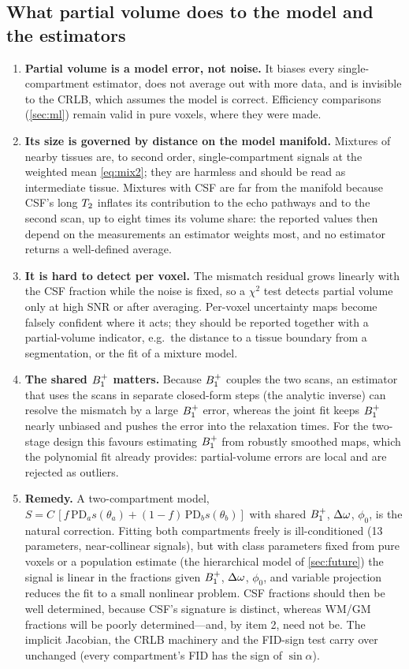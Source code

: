 \subsection{What partial volume does to the model and the estimators}

\begin{enumerate}
\item \textbf{Partial volume is a model error, not noise.} It biases every single-compartment
  estimator, does not average out with more data, and is invisible to the CRLB, which assumes
  the model is correct. Efficiency comparisons (\cref{sec:ml}) remain valid in pure voxels,
  where they were made.
\item \textbf{Its size is governed by distance on the model manifold.} Mixtures of nearby
  tissues are, to second order, single-compartment signals at the weighted mean \eqref{eq:mix2};
  they are harmless and should be read as intermediate tissue. Mixtures with CSF are far from the
  manifold because CSF's long $T_2$ inflates its contribution to the echo pathways and to the
  second scan, up to eight times its volume share: the reported values then depend on the
  measurements an estimator weights most, and no estimator returns a well-defined average.
\item \textbf{It is hard to detect per voxel.} The mismatch residual grows linearly with the
  CSF fraction while the noise is fixed, so a $\chi^2$ test detects partial volume only at high SNR
  or after averaging. Per-voxel uncertainty maps become falsely confident where it acts; they
  should be reported together with a partial-volume indicator, e.g.\ the distance to a tissue
  boundary from a segmentation, or the fit of a mixture model.
\item \textbf{The shared $B_1^{+}$ matters.} Because $B_1^{+}$ couples the two scans, an estimator that uses the
  scans in separate closed-form steps (the analytic inverse) can resolve the mismatch by a large
  $B_1^{+}$ error, whereas the joint fit keeps $B_1^{+}$ nearly unbiased and pushes the error into the
  relaxation times. For the two-stage design this favours estimating $B_1^{+}$ from robustly smoothed
  maps, which the polynomial fit already provides: partial-volume errors are local and are
  rejected as outliers.
\item \textbf{Remedy.} A two-compartment model,
  $S=C\,[f\,\mathrm{PD}_as(\theta_a)+(1-f)\,\mathrm{PD}_bs(\theta_b)]$ with shared $B_1^{+}$, $\Delta\omega$, $\phi_0$, is the natural
  correction. Fitting both compartments freely is ill-conditioned (13 parameters, near-collinear
  signals), but with class parameters fixed from pure voxels or a population estimate (the
  hierarchical model of \cref{sec:future}) the signal is linear in the fractions given $B_1^{+}$, $\Delta\omega$,
  $\phi_0$, and variable projection reduces the fit to a small nonlinear problem. CSF fractions should
  then be well determined, because CSF's signature is distinct, whereas WM/GM fractions will be
  poorly determined---and, by item 2, need not be. The implicit Jacobian, the CRLB machinery and
  the FID-sign test carry over unchanged (every compartment's FID has the sign of $\sin\alpha$).
\end{enumerate}
